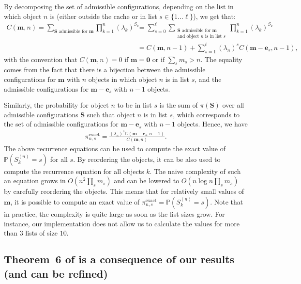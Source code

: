 \documentclass[acmsmall]{acmart}
\newcommand\be{\mathbf{e}}
\newcommand\bm{\mathbf{m}}
\newcommand\bS{\mathbf{S}}
\newcommand\Proba[1]{\mathbb{P}\left(#1\right)} %
\begin{document}
By decomposing the set of admissible configurations, depending on the list in which object $n$ is (either outside the cache or in list $s\in\{1\dots\ell\}$), we get that:
\begin{align*}
  C(\bm,n)=\sum_{\text{$\bS$ admissible for $\bm$}}\prod_{k=1}^n (\lambda_k)^{S_k}
  &=\sum_{s=0}^\ell \sum_{\substack{\text{$\bS$ admissible for $\bm$} \\ \text{and object $n$ is in list $s$}}}\prod_{k=1}^n (\lambda_k)^{S_k}\\
  &= C(\bm,n-1)+\sum_{s=1}^\ell (\lambda_n)^{s}C(\bm-\be_s,n-1),
\end{align*}
with the convention that $C(\bm,n)=0$ if $\bm=\mathbf{0}$ or if $\sum_s m_s>n$. The equality comes from the fact that there is a bijection between the admissible configurations for $\bm$ with $n$ objects in which object $n$ is in list $s$, and the admissible configurations for $\bm-\be_s$ with $n-1$ objects.

Similarly, the probability for object $n$ to be in list $s$ is the sum of $\pi(\bS)$ over all admissible configurations $\bS$ such that object $n$ is in list $s$, which corresponds to the set of admissible configurations for $\bm-\be_s$ with $n-1$ objects. Hence, we have
\begin{align}
  \label{eq:cache_exact}
  \pi_{n,s}^{\text{exact}} = \frac{(\lambda_n)^s C(\bm-\be_s, n-1)}{C(\bm,n)}.
\end{align}
The above recurrence equations can be used to compute the exact value of $\Proba{S_k^{(n)}=s}$ for all $s$. By reordering the objects, it can be also used to compute the recurrence equation for all objects $k$. The naive complexity of such an equation grows in $O(n^2\prod_{s}m_s)$ and can be lowered to $O(n\log n\prod_{s}m_s)$ by carefully reordering the objects. This means that for relatively small values of $\bm$, it is possible to compute an exact value of $\pi_{n,s}^{\text{exact}} = \Proba{S^{(n)}_k=s}$. Note that in practice, the complexity is quite large as soon as the list sizes grow. For instance, our implementation does not allow us to calculate the values for more than $3$ lists of size $10$.


\subsection{Theorem~6 of \cite{gastTransientSteadystateRegime2015} is a consequence of our results (and can be refined)}
\label{apx:cache_adaptation2}
\end{document}
